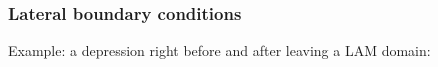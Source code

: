 \documentclass[aspectratio=43,9pt]{beamer}
\begin{document}
\begin{frame}
	\frametitle{Lateral boundary conditions}
	Example: a depression right before and after leaving a LAM domain:
	\begin{center}
		\hspace*{-10mm}%
	\end{center}
\end{frame}
%
%
\end{document}
